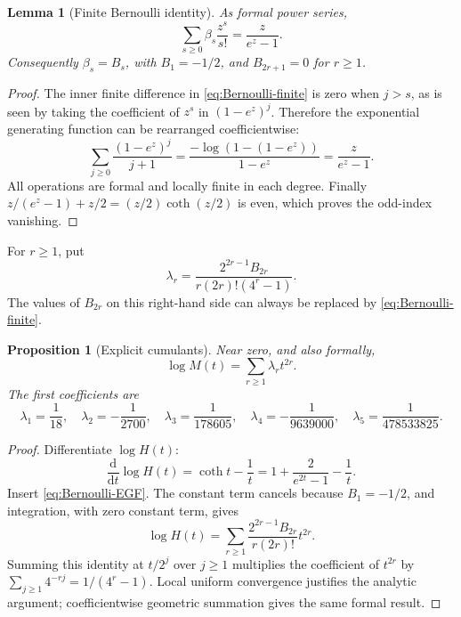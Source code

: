 \documentclass[11pt,a4paper]{article}
\numberwithin{equation}{section}
\newtheorem{lemma}[theorem]{Lemma}
\newtheorem{proposition}[theorem]{Proposition}
\theoremstyle{definition}
\theoremstyle{remark}
\begin{document}
\begin{lemma}[Finite Bernoulli identity]
\label{lem:Bernoulli}
As formal power series,
\begin{equation}
 \sum_{s\ge0}\beta_s\frac{z^s}{s!}=\frac{z}{e^z-1}.
 \label{eq:Bernoulli-EGF}
\end{equation}
Consequently $\beta_s=B_s$, with $B_1=-1/2$, and $B_{2r+1}=0$ for $r\ge1$.
\end{lemma}
\begin{proof}
The inner finite difference in \cref{eq:Bernoulli-finite} is zero when $j>s$, as is seen by taking the coefficient of $z^s$ in $(1-e^z)^j$. Therefore the exponential generating function can be rearranged coefficientwise:
\[
 \sum_{j\ge0}\frac{(1-e^z)^j}{j+1}
 =\frac{-\log(1-(1-e^z))}{1-e^z}
 =\frac{z}{e^z-1}.
\]
All operations are formal and locally finite in each degree. Finally
$z/(e^z-1)+z/2=(z/2)\coth(z/2)$ is even, which proves the odd-index vanishing.
\end{proof}

For $r\ge1$, put
\begin{equation}
 \lambda_r=\frac{2^{2r-1}B_{2r}}{r(2r)!(4^r-1)}.
 \label{eq:lambda}
\end{equation}
The values of $B_{2r}$ on this right-hand side can always be replaced by \cref{eq:Bernoulli-finite}.

\begin{proposition}[Explicit cumulants]
\label{prop:log-M}
Near zero, and also formally,
\begin{equation}
 \log M(t)=\sum_{r\ge1}\lambda_rt^{2r}.
 \label{eq:log-M}
\end{equation}
The first coefficients are
\begin{equation}
 \lambda_1=\frac1{18},\quad
 \lambda_2=-\frac1{2700},\quad
 \lambda_3=\frac1{178605},\quad
 \lambda_4=-\frac1{9639000},\quad
 \lambda_5=\frac1{478533825}.
 \label{eq:lambda-small}
\end{equation}
\end{proposition}
\begin{proof}
Differentiate $\log H(t)$:
\[
 \frac{\mathrm d}{\mathrm dt}\log H(t)
 =\coth t-\frac1t
 =1+\frac{2}{e^{2t}-1}-\frac1t.
\]
Insert \cref{eq:Bernoulli-EGF}. The constant term cancels because $B_1=-1/2$, and integration, with zero constant term, gives
\[
 \log H(t)=\sum_{r\ge1}\frac{2^{2r-1}B_{2r}}{r(2r)!}t^{2r}.
\]
Summing this identity at $t/2^j$ over $j\ge1$ multiplies the coefficient of $t^{2r}$ by $\sum_{j\ge1}4^{-rj}=1/(4^r-1)$. Local uniform convergence justifies the analytic argument; coefficientwise geometric summation gives the same formal result.
\end{proof}
\end{document}
